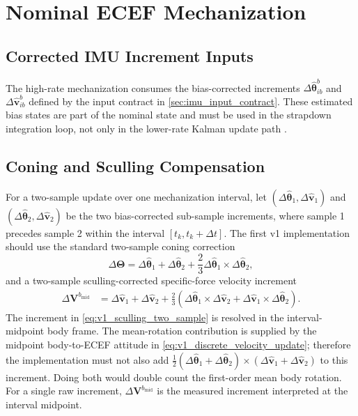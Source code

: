 \chapter{Nominal ECEF Mechanization}

\section{Corrected IMU Increment Inputs}

The high-rate mechanization consumes the bias-corrected increments
$\Delta\hat{\boldsymbol\theta}_{ib}^{b}$ and
$\Delta\hat{\mathbf{v}}_{ib}^{b}$ defined by the input contract in
\cref{sec:imu_input_contract}. These estimated bias states are part of the
nominal state and must be used in the strapdown integration loop, not only in
the lower-rate Kalman update path \cite{groves2013,titterton2004}.

\section{Coning and Sculling Compensation}

For a two-sample update over one mechanization interval, let
$(\Delta\hat{\boldsymbol\theta}_1,\Delta\hat{\mathbf{v}}_1)$ and
$(\Delta\hat{\boldsymbol\theta}_2,\Delta\hat{\mathbf{v}}_2)$ be the two
bias-corrected sub-sample increments, where sample 1 precedes sample 2 within
the interval $[t_k,t_k+\Delta t]$. The first v1 implementation should use the
standard two-sample coning correction
\begin{equation}
\Delta\boldsymbol\Theta
=
\Delta\hat{\boldsymbol\theta}_1
+
\Delta\hat{\boldsymbol\theta}_2
+
\frac{2}{3}
\Delta\hat{\boldsymbol\theta}_1
\times
\Delta\hat{\boldsymbol\theta}_2,
\label{eq:v1_coning_two_sample}
\end{equation}
and a two-sample sculling-corrected specific-force velocity increment
\begin{align}
\Delta\mathbf{V}^{b_{\mathrm{mid}}}
&=
\Delta\hat{\mathbf{v}}_1
+
\Delta\hat{\mathbf{v}}_2
+
\frac{2}{3}
\left(
\Delta\hat{\boldsymbol\theta}_1
\times
\Delta\hat{\mathbf{v}}_2
+
\Delta\hat{\mathbf{v}}_1
\times
\Delta\hat{\boldsymbol\theta}_2
\right).
\label{eq:v1_sculling_two_sample}
\end{align}
The increment in \cref{eq:v1_sculling_two_sample} is resolved in the
interval-midpoint body frame. The mean-rotation contribution is supplied by
the midpoint body-to-ECEF attitude in
\cref{eq:v1_discrete_velocity_update}; therefore the implementation must not
also add
$\tfrac{1}{2}(\Delta\hat{\boldsymbol\theta}_1+
\Delta\hat{\boldsymbol\theta}_2)\times
(\Delta\hat{\mathbf{v}}_1+\Delta\hat{\mathbf{v}}_2)$ to this increment.
Doing both would double count the first-order mean body rotation. For a
single raw increment, $\Delta\mathbf{V}^{b_{\mathrm{mid}}}$ is the measured
increment interpreted at the interval midpoint.

